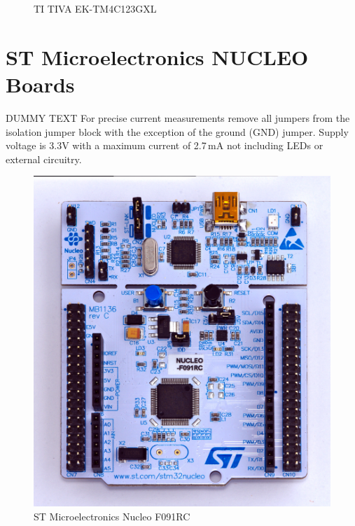 \documentclass[twoside,11pt]{cergdoc}
\begin{document}
\begin{figure}[ht]
\begin{minipage}{.5\textwidth}
    \caption{TI TIVA EK-TM4C123GXL}\label{fig:tiva}
  \end{minipage}
\vspace{-1ex}
\end{figure}


\section{ST Microelectronics NUCLEO Boards}

DUMMY TEXT For precise current measurements remove all jumpers from the isolation jumper block 
with the exception of the ground (GND) jumper. Supply voltage is 3.3V with a maximum 
current of 2.7\,mA not including LEDs or external circuitry.

\begin{figure}[ht]
  \begin{center}
    \includegraphics[scale=0.6]{figures/nucleo-f091rc}
    \caption{ST Microelectronics Nucleo F091RC}\label{fig:f091rc}
  \end{center}
\vspace{-1ex}
\end{figure}


\end{document}
